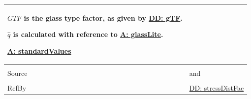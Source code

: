 \documentclass[12pt]{article}
\begin{document}
\begin{minipage}{\textwidth}
\begin{tabular}{>{\raggedright}p{}>{\raggedright\arraybackslash}p{}}
        $GTF$ is the glass type factor, as given by \hyperref[DD:gTF]{DD: gTF}.
        
        $\hat{q}$ is calculated with reference to \hyperref[assumpGL]{A: glassLite}.
        
        \hyperref[assumpSV]{A: standardValues}
        
\\ \midrule \\
Source & \cite{astm2009} and \cite[(Eq. 7)]{campidelli}
         
\\ \midrule \\
RefBy & \hyperref[DD:stressDistFac]{DD: stressDistFac}
        
\\ \bottomrule
\end{tabular}
\end{minipage}
\end{document}
